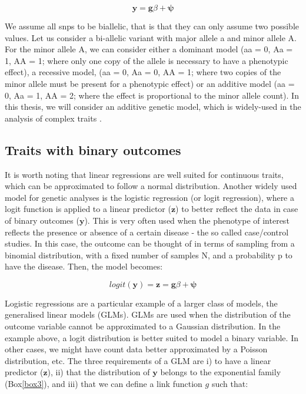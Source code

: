 \begin{equation}\label{eq:Linear_regression_genetics}
 \mathbf{y} = \mathbf{g}\beta + \boldsymbol{\psi} 
\end{equation}

We assume all \gls{snps} to be biallelic, that is that they can only assume two possible values. 
Let us consider a bi-allelic variant with major allele a and minor allele A. For the minor allele A, we can consider either a dominant model (aa = 0, Aa = 1, AA = 1; where only one copy of the allele is necessary to have a phenotypic effect), a recessive model, (aa = 0, Aa = 0, AA = 1; where two copies of the minor allele must be present for a phenotypic effect) or an additive model (aa = 0, Aa = 1, AA = 2; where the effect is proportional to the minor allele count). 
In this thesis, we will consider an additive genetic model, which is widely-used in the analysis of complex traits \cite{laird2010fundamentals}.

\subsection{Traits with binary outcomes}

It is worth noting that linear regressions are well suited for continuous traits, which can be approximated to follow a normal distribution. 
Another widely used model for genetic analyses is the logistic regression (or logit regression), where a logit function is applied to a linear predictor ($\mathbf{z}$) to better reflect the data in case of binary outcomes ($\mathbf{y}$). 
This is very often used when the phenotype of interest reflects the presence or absence of a certain disease - the so called case/control studies.
In this case, the outcome can be thought of in terms of sampling from a binomial distribution, with a fixed number of samples N, and a probability p to have the disease. Then, the model becomes:

\begin{equation}\label{eq:Logistic_regression_genetics_z}
 logit(\mathbf{y}) = \mathbf{z} = \mathbf{g}\beta + \boldsymbol{\psi} 
\end{equation}

Logistic regressions are a particular example of a larger class of models, the generalised linear models (GLMs). 
GLMs are used when the distribution of the outcome variable cannot be approximated to a Gaussian distribution. 
In the example above, a logit distribution is better suited to model a binary variable. 
In other cases, we might have count data better approximated by a Poisson distribution, etc.
The three requirements of a GLM are i) to have a linear predictor ($\mathbf{z}$), ii) that the distribution of $\mathbf{y}$  belongs to the exponential family (Box\ref{box3}), and iii) that we can define a link function $g$ such that:

